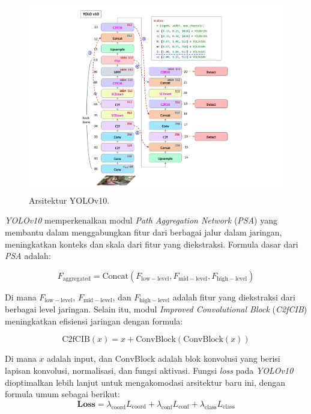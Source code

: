 \begin{figure}[H]
  \centering
  \includegraphics[scale=0.5]{gambar/YoloV10Architecture.png}
  \caption{Arsitektur YOLOv10.}
  \label{fig:ArsitekturYolov10}
\end{figure}

\emph{YOLOv10} memperkenalkan modul \emph{Path Aggregation Network} (\emph{PSA}) yang membantu dalam menggabungkan fitur dari berbagai jalur dalam jaringan, meningkatkan konteks dan skala dari fitur yang diekstraksi. Formula dasar dari \emph{PSA} adalah:

\begin{equation}
  F_{\mathrm{aggregated}} = \mathrm{Concat}(F_{\mathrm{low-level}}, F_{\mathrm{mid-level}}, F_{\mathrm{high-level}})
\end{equation}

Di mana \( F_{\mathrm{low-level}} \), \( F_{\mathrm{mid-level}} \), dan \( F_{\mathrm{high-level}} \) adalah fitur yang diekstraksi dari berbagai level jaringan. Selain itu, modul \emph{Improved Convolutional Block} (\emph{C2fCIB}) meningkatkan efisiensi jaringan dengan formula:

\begin{equation}
  \mathrm{C2fCIB}(x) = x + \mathrm{ConvBlock}(\mathrm{ConvBlock}(x))
\end{equation}

Di mana \( x \) adalah input, dan \( \mathrm{ConvBlock} \) adalah blok konvolusi yang berisi lapisan konvolusi, normalisasi, dan fungsi aktivasi. Fungsi \emph{loss} pada \emph{YOLOv10} dioptimalkan lebih lanjut untuk mengakomodasi arsitektur baru ini, dengan formula umum sebagai berikut:
\begin{equation}
  \mathbf{Loss} = \lambda_{\mathrm{coord}} L_{\mathrm{coord}} + \lambda_{\mathrm{conf}} L_{\mathrm{conf}} + \lambda_{\mathrm{class}} L_{\mathrm{class}}
\end{equation}


